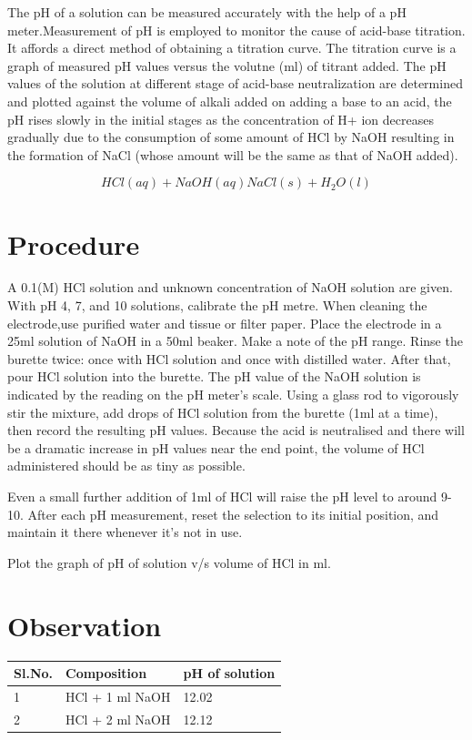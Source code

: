 \documentclass{report}
\begin{document}
The pH of a solution can be measured accurately with the help of a pH meter.Measurement of pH is employed to monitor the cause of acid-base titration. It affords a direct method of obtaining a titration curve. The titration curve is a graph of measured pH values versus the volutne (ml) of titrant added. The pH values of the solution at different stage of acid-base neutralization are determined and plotted against the volume of alkali added on adding a base to an acid, the pH rises slowly in the initial stages as the concentration of H+ ion decreases gradually due to the consumption of some amount of HCl by NaOH resulting in the formation of NaCl (whose amount will be the same as that of NaOH added).

$$HCl(aq)+NaOH(aq) NaCl(s)+H_2O(l) $$

\section*{Procedure}
A 0.1(M) HCl solution and unknown concentration of NaOH solution are given. With pH 4, 7, and 10 solutions, calibrate the pH metre. When cleaning the electrode,use purified water and tissue or filter paper. Place the electrode in a 25ml solution of NaOH in a 50ml beaker. Make a note of the pH range. Rinse the burette twice: once with HCl solution and once with distilled water. After that, pour HCl solution into the burette. The pH value of the NaOH solution is indicated by the reading on the pH meter's scale. Using a glass rod to vigorously stir the mixture, add drops of HCl solution from the burette (1ml at a time), then record the resulting pH values.
Because the acid is neutralised and there will be a dramatic increase in pH values near the end point, the volume of HCl administered should be as tiny as possible.

Even a small further addition of 1ml of HCl will raise the pH level to around 9-10.
After each pH measurement, reset the selection to its initial position, and maintain it there whenever it's not in use.

Plot the graph of pH of solution v/s volume of HCl in ml.

\section*{Observation}
\begin{table}[H]
\begin{tabular}{|l|l|l|}
\hline
\textbf{Sl.No.} & \textbf{Composition} & \textbf{pH of solution} \\ \hline
1               & HCl + 1 ml NaOH        &     12.02                    \\ \hline
2               & HCl + 2 ml NaOH        &     12.12                   \\ \hline
\end{tabular}
\end{table}
\end{document}
